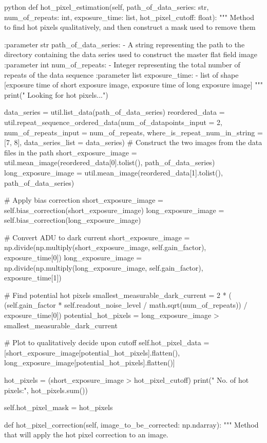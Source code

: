\documentclass[../main.tex]{subfiles}
\begin{document}
\begin{mintedbox}{python}
def hot_pixel_estimation(self, path_of_data_series: str, num_of_repeats: int, exposure_time: list,
hot_pixel_cutoff: float):
"""
Method to find hot pixels qualitatively, and then construct a mask used to remove them

:parameter str path_of_data_series:
- A string representing the path to the directory
containing the data series used to construct the
master flat field image
:parameter int num_of_repeats:
- Integer representing the total number of repeats of the data sequence
:parameter list exposure_time:
- list of shape [exposure time of short exposure image, exposure time of long exposure image]
"""
print(" Looking for hot pixels...")

data_series  =  util.list_data(path_of_data_series)
reordered_data  =  util.repeat_sequence_ordered_data(num_of_datapoints_input = 2,
num_of_repeats_input = num_of_repeats,
where_is_repeat_num_in_string = [7, 8],
data_series_list = data_series)
# Construct the two images from the data files in the path
short_exposure_image  =  util.mean_image(reordered_data[0].tolist(), path_of_data_series)
long_exposure_image  =  util.mean_image(reordered_data[1].tolist(), path_of_data_series)

# Apply bias correction
short_exposure_image  =  self.bias_correction(short_exposure_image)
long_exposure_image  =  self.bias_correction(long_exposure_image)

# Convert ADU to dark current
short_exposure_image  =  np.divide(np.multiply(short_exposure_image, self.gain_factor), exposure_time[0])
long_exposure_image  =  np.divide(np.multiply(long_exposure_image, self.gain_factor), exposure_time[1])

# Find potential hot pixels
smallest_measurable_dark_current  =  2 * (
(self.gain_factor * self.readout_noise_level / math.sqrt(num_of_repeats)) / exposure_time[0])
potential_hot_pixels  =  long_exposure_image > smallest_measurable_dark_current

# Plot to qualitatively decide upon cutoff
self.hot_pixel_data  =  [short_exposure_image[potential_hot_pixels].flatten(),
long_exposure_image[potential_hot_pixels].flatten()]

hot_pixels  =  (short_exposure_image > hot_pixel_cutoff)
print("  No. of hot pixels:", hot_pixels.sum())

self.hot_pixel_mask  =  hot_pixels

def hot_pixel_correction(self, image_to_be_corrected: np.ndarray):
"""
Method that will apply the hot pixel correction to an image.


\end{mintedbox}
\end{document}
